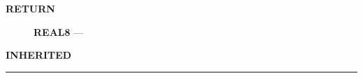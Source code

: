 \par
\begin{description}
\item [\colorbox{tagtype}{\color{white} \textbf{\textsf{RETURN}}}] \textbf{REAL8} --- 
\end{description}






\par
\begin{description}
\item [\colorbox{tagtype}{\color{white} \textbf{\textsf{INHERITED}}}] 
\end{description}



\rule{\linewidth}{0.5pt}




